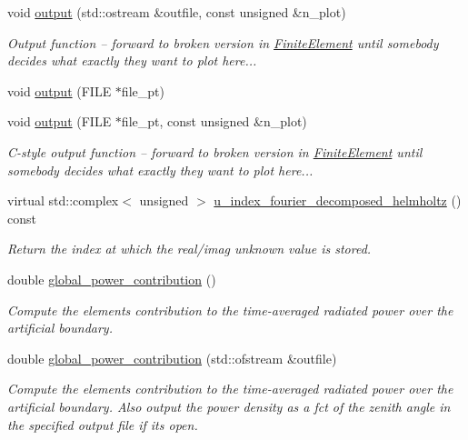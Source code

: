 \begin{DoxyCompactItemize}
\item 
void \hyperlink{classoomph_1_1FourierDecomposedHelmholtzBCElementBase_a2caddd8509771b2976895f1f08b90e89}{output} (std\+::ostream \&outfile, const unsigned \&n\+\_\+plot)
\begin{DoxyCompactList}\small\item\em Output function -- forward to broken version in \hyperlink{classoomph_1_1FiniteElement}{Finite\+Element} until somebody decides what exactly they want to plot here... \end{DoxyCompactList}\item 
void \hyperlink{classoomph_1_1FourierDecomposedHelmholtzBCElementBase_a06238e8fd09c6daf38d5cea2c7f38404}{output} (F\+I\+LE $\ast$file\+\_\+pt)
\item 
void \hyperlink{classoomph_1_1FourierDecomposedHelmholtzBCElementBase_a497d1952481a116fe68f20f5c937166b}{output} (F\+I\+LE $\ast$file\+\_\+pt, const unsigned \&n\+\_\+plot)
\begin{DoxyCompactList}\small\item\em C-\/style output function -- forward to broken version in \hyperlink{classoomph_1_1FiniteElement}{Finite\+Element} until somebody decides what exactly they want to plot here... \end{DoxyCompactList}\item 
virtual std\+::complex$<$ unsigned $>$ \hyperlink{classoomph_1_1FourierDecomposedHelmholtzBCElementBase_ae3b5e32d07a1dc898fec269470cf2000}{u\+\_\+index\+\_\+fourier\+\_\+decomposed\+\_\+helmholtz} () const
\begin{DoxyCompactList}\small\item\em Return the index at which the real/imag unknown value is stored. \end{DoxyCompactList}\item 
double \hyperlink{classoomph_1_1FourierDecomposedHelmholtzBCElementBase_ab9610b7f417f100b331e8d4885edab36}{global\+\_\+power\+\_\+contribution} ()
\begin{DoxyCompactList}\small\item\em Compute the element\textquotesingle{}s contribution to the time-\/averaged radiated power over the artificial boundary. \end{DoxyCompactList}\item 
double \hyperlink{classoomph_1_1FourierDecomposedHelmholtzBCElementBase_a22704a98a6a28b9b2cd52bcaa78b23e1}{global\+\_\+power\+\_\+contribution} (std\+::ofstream \&outfile)
\begin{DoxyCompactList}\small\item\em Compute the element\textquotesingle{}s contribution to the time-\/averaged radiated power over the artificial boundary. Also output the power density as a fct of the zenith angle in the specified output file if it\textquotesingle{}s open. \end{DoxyCompactList}\end{DoxyCompactItemize}
